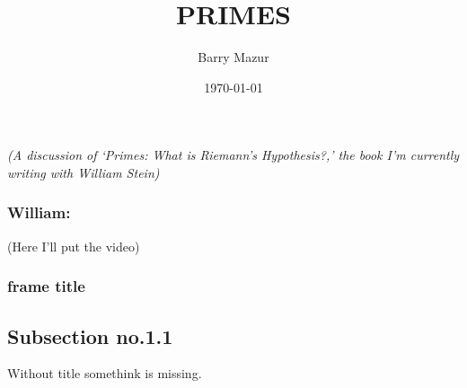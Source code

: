 \documentclass{beamer}
\title{PRIMES}
\author{Barry Mazur}
\date{\today}
\newcommand{\illtwo}[4]{%
   \begin{figure}[H]\centering%
   \texttt{[image: illustrations/\#1]}$\qquad$\texttt{[image: illustrations/\#2]}%
   \caption{#4}%
    \end{figure}}
\begin{document}
\begin{frame}
\titlepage

{\it (A discussion of `Primes: What is Riemann's Hypothesis?,' the book I'm currently writing with William Stein)}
\end{frame}

\begin{frame}
\frametitle{William:}
 (Here I'll put the video)
\end{frame}
\begin{frame}
\frametitle{frame title}

\end{frame}

\subsection{Subsection no.1.1  }
\begin{frame}
Without title somethink is missing.
\end{frame}
\end{document}
